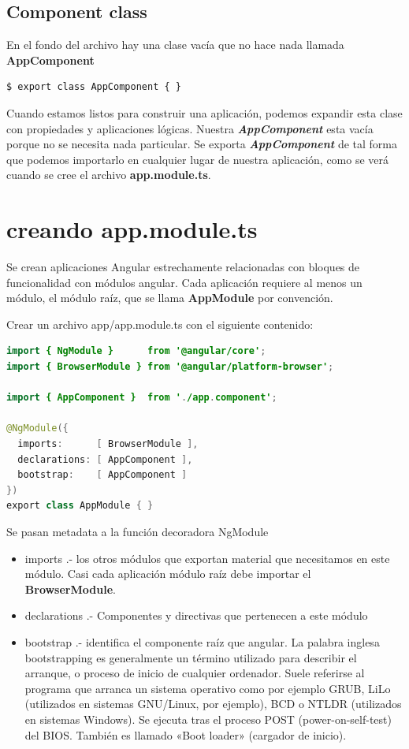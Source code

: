 \documentclass[12pt,twoside]{book}
\begin{document}
\subsection{Component class}

En el fondo del archivo hay una clase vacía que no hace nada llamada
\textbf{AppComponent}

\begin{lstlisting}[language=bash]
$ export class AppComponent { }
\end{lstlisting}

Cuando estamos listos para construir una aplicación, podemos expandir esta clase con propiedades y aplicaciones lógicas. Nuestra \textit{\textbf{AppComponent}} esta vacía porque no se necesita nada particular.
Se exporta \textit{\textbf{AppComponent}} de tal forma que podemos importarlo en cualquier lugar de nuestra aplicación, como se verá cuando se cree el archivo \textbf{app.module.ts}.

\section{creando app.module.ts}
Se crean aplicaciones Angular estrechamente relacionadas con bloques de funcionalidad con módulos angular. Cada aplicación requiere al menos un módulo, el módulo raíz, que se llama \textbf{AppModule} por convención.


Crear un archivo app/app.module.ts con el siguiente contenido:

\begin{lstlisting}[language=java]
import { NgModule }      from '@angular/core';
import { BrowserModule } from '@angular/platform-browser';

import { AppComponent }  from './app.component';

@NgModule({
  imports:      [ BrowserModule ],
  declarations: [ AppComponent ],
  bootstrap:    [ AppComponent ]
})
export class AppModule { }
\end{lstlisting}

Se pasan metadata a la función decoradora NgModule

\begin{itemize}
\item imports .- los otros módulos que exportan material que necesitamos en este módulo. Casi cada aplicación módulo raíz debe importar el \textbf{BrowserModule}.
\item declarations .- Componentes y directivas que pertenecen a este módulo
\item bootstrap .- identifica el componente raíz que angular. La palabra inglesa bootstrapping es generalmente un término utilizado para describir el arranque, o proceso de inicio de cualquier ordenador. Suele referirse al programa que arranca un sistema operativo como por ejemplo GRUB, LiLo (utilizados en sistemas GNU/Linux, por ejemplo), BCD o NTLDR (utilizados en sistemas Windows). Se ejecuta tras el proceso POST (power-on-self-test) del BIOS. También es llamado «Boot loader» (cargador de inicio).
\end{itemize}
\end{document}

